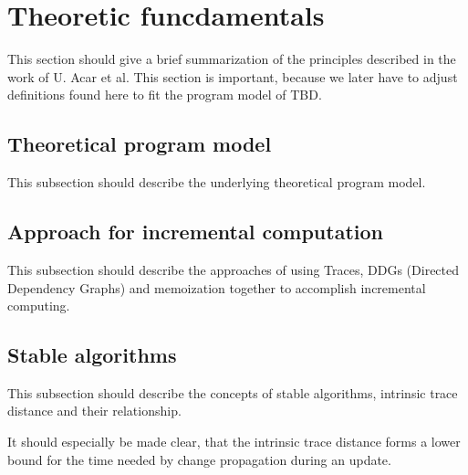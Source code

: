 \section{Theoretic funcdamentals}
\label{sec:ddg_memo}
This section should give a brief summarization of the principles described in the work of U. Acar et al. This section is important, because we later have to adjust definitions found here to fit the program model of TBD. \cite{Acar2005thesis}

\subsection{Theoretical program model}
This subsection should describe the underlying theoretical program model. 

\subsection{Approach for incremental computation}
This subsection should describe the approaches of using Traces, DDGs (Directed Dependency Graphs) and memoization together to accomplish incremental computing. 

\subsection{Stable algorithms}
This subsection should describe the concepts of stable algorithms, intrinsic trace distance and their relationship. 

It should especially be made clear, that the intrinsic trace distance forms a lower bound for the time needed by change propagation during an update. 